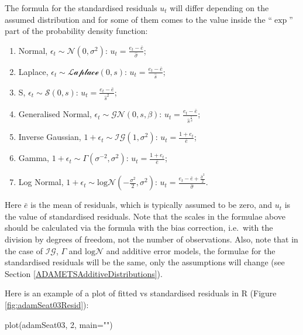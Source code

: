 \documentclass[
]{book}
\newenvironment{Shaded}{\begin{snugshade}}{\end{snugshade}}
\newcommand{\AttributeTok}[1]{\textcolor[rgb]{0.77,0.63,0.00}{#1}}
\newcommand{\DecValTok}[1]{\textcolor[rgb]{0.00,0.00,0.81}{#1}}
\newcommand{\FunctionTok}[1]{\textcolor[rgb]{0.00,0.00,0.00}{#1}}
\newcommand{\NormalTok}[1]{#1}
\newcommand{\StringTok}[1]{\textcolor[rgb]{0.31,0.60,0.02}{#1}}
\providecommand{\tightlist}{%
  \setlength{\itemsep}{0pt}\setlength{\parskip}{0pt}}
\theoremstyle{definition}
\theoremstyle{definition}
\theoremstyle{definition}
\theoremstyle{definition}
\theoremstyle{remark}
\begin{document}
The formula for the standardised residuals \(u_t\) will differ depending on the assumed distribution and for some of them comes to the value inside the ``\(\exp\)'' part of the probability density function:

\begin{enumerate}
\def\labelenumi{\arabic{enumi}.}
\tightlist
\item
  Normal, \(\epsilon_t \sim \mathcal{N}(0, \sigma^2)\): \(u_t = \frac{e_t -\bar{e}}{\hat{\sigma}}\);
\item
  Laplace, \(\epsilon_t \sim \mathcal{Laplace}(0, s)\): \(u_t = \frac{e_t -\bar{e}}{\hat{s}}\);
\item
  S, \(\epsilon_t \sim \mathcal{S}(0, s)\): \(u_t = \frac{e_t -\bar{e}}{\hat{s}^2}\);
\item
  Generalised Normal, \(\epsilon_t \sim \mathcal{GN}(0, s, \beta)\): \(u_t = \frac{e_t -\bar{e}}{\hat{s}^{\frac{1}{\beta}}}\);
\item
  Inverse Gaussian, \(1+\epsilon_t \sim \mathcal{IG}(1, \sigma^2)\): \(u_t = \frac{1+e_t}{\bar{e}}\);
\item
  Gamma, \(1+\epsilon_t \sim \mathcal{\Gamma}(\sigma^{-2}, \sigma^2)\): \(u_t = \frac{1+e_t}{\bar{e}}\);
\item
  Log Normal, \(1+\epsilon_t \sim \mathrm{log}\mathcal{N}\left(-\frac{\sigma^2}{2}, \sigma^2\right)\): \(u_t = \frac{e_t -\bar{e} +\frac{\hat{\sigma}^2}{2}}{\hat{\sigma}}\).
\end{enumerate}

Here \(\bar{e}\) is the mean of residuals, which is typically assumed to be zero, and \(u_t\) is the value of standardised residuals. Note that the scales in the formulae above should be calculated via the formula with the bias correction, i.e.~with the division by degrees of freedom, not the number of observations. Also, note that in the case of \(\mathcal{IG}\), \(\Gamma\) and \(\mathrm{log}\mathcal{N}\) and additive error models, the formulae for the standardised residuals will be the same, only the assumptions will change (see Section \ref{ADAMETSAdditiveDistributions}).

Here is an example of a plot of fitted vs standardised residuals in R (Figure \ref{fig:adamSeat03Resid}):

\begin{Shaded}
\begin{Highlighting}[]
\FunctionTok{plot}\NormalTok{(adamSeat03, }\DecValTok{2}\NormalTok{, }\AttributeTok{main=}\StringTok{""}\NormalTok{)}
\end{Highlighting}
\end{Shaded}
\end{document}
